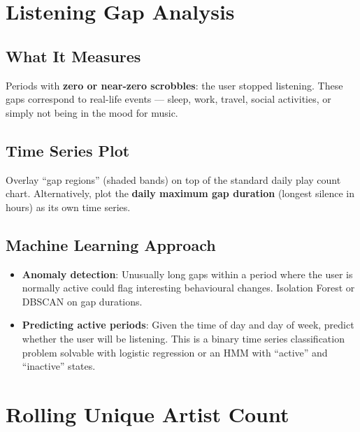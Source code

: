 \documentclass[12pt, a4paper]{article}
\begin{document}
\section{Listening Gap Analysis}

\subsection{What It Measures}

Periods with \textbf{zero or near-zero scrobbles}: the user stopped
listening. These gaps correspond to real-life events --- sleep, work, travel,
social activities, or simply not being in the mood for music.

\subsection{Time Series Plot}

Overlay ``gap regions'' (shaded bands) on top of the standard daily play
count chart. Alternatively, plot the \textbf{daily maximum gap duration}
(longest silence in hours) as its own time series.

\subsection{Machine Learning Approach}

\begin{itemize}
    \item \textbf{Anomaly detection}: Unusually long gaps within a period
          where the user is normally active could flag interesting behavioural
          changes. Isolation Forest or DBSCAN on gap durations.
    \item \textbf{Predicting active periods}: Given the time of day and day
          of week, predict whether the user will be listening. This is a
          binary time series classification problem solvable with logistic
          regression or an HMM with ``active'' and ``inactive'' states.
\end{itemize}

\section{Rolling Unique Artist Count}
\end{document}
